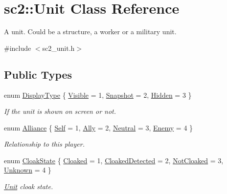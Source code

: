 \hypertarget{classsc2_1_1_unit}{}\section{sc2\+:\+:Unit Class Reference}
\label{classsc2_1_1_unit}


A unit. Could be a structure, a worker or a military unit.  




{\ttfamily \#include $<$sc2\+\_\+unit.\+h$>$}

\subsection*{Public Types}
\begin{DoxyCompactItemize}
\item 
enum \hyperlink{classsc2_1_1_unit_af7815dad89107a05298c245b702ab270}{Display\+Type} \{ \hyperlink{classsc2_1_1_unit_af7815dad89107a05298c245b702ab270abd326f19234975ca23bb3265223d969d}{Visible} = 1, 
\hyperlink{classsc2_1_1_unit_af7815dad89107a05298c245b702ab270a0e970750301873d6ee4903e9bcb8d2c6}{Snapshot} = 2, 
\hyperlink{classsc2_1_1_unit_af7815dad89107a05298c245b702ab270a688e1743ab48c61d2e77ac6212f77cd9}{Hidden} = 3
 \}\begin{DoxyCompactList}\small\item\em If the unit is shown on screen or not. \end{DoxyCompactList}
\item 
enum \hyperlink{classsc2_1_1_unit_a5a40e672e7599d73ef8ef5758bbd7461}{Alliance} \{ \hyperlink{classsc2_1_1_unit_a5a40e672e7599d73ef8ef5758bbd7461af4dea1a00c973443e0d459bb522f7637}{Self} = 1, 
\hyperlink{classsc2_1_1_unit_a5a40e672e7599d73ef8ef5758bbd7461a2215843e5737efd34b268be16757ed27}{Ally} = 2, 
\hyperlink{classsc2_1_1_unit_a5a40e672e7599d73ef8ef5758bbd7461a50d778ca3f3c354474d27013b7eda3c1}{Neutral} = 3, 
\hyperlink{classsc2_1_1_unit_a5a40e672e7599d73ef8ef5758bbd7461a005610fbf80eaa3cc4ea28c26a42eae6}{Enemy} = 4
 \}\begin{DoxyCompactList}\small\item\em Relationship to this player. \end{DoxyCompactList}
\item 
enum \hyperlink{classsc2_1_1_unit_a03f99cfaa8ad4f9bba6cd0bc5586c943}{Cloak\+State} \{ \hyperlink{classsc2_1_1_unit_a03f99cfaa8ad4f9bba6cd0bc5586c943ac0cfb31c1521ab9e7759bfa12bf05b23}{Cloaked} = 1, 
\hyperlink{classsc2_1_1_unit_a03f99cfaa8ad4f9bba6cd0bc5586c943a4d1351a1f8046904bf4b089813b610b0}{Cloaked\+Detected} = 2, 
\hyperlink{classsc2_1_1_unit_a03f99cfaa8ad4f9bba6cd0bc5586c943a992a9de6738dc46b3ba64a6da9030f0f}{Not\+Cloaked} = 3, 
\hyperlink{classsc2_1_1_unit_a03f99cfaa8ad4f9bba6cd0bc5586c943a2cf1dac1fc0a53735ae998f1cd437446}{Unknown} = 4
 \}\begin{DoxyCompactList}\small\item\em \hyperlink{classsc2_1_1_unit}{Unit} cloak state. \end{DoxyCompactList}
\end{DoxyCompactItemize}
